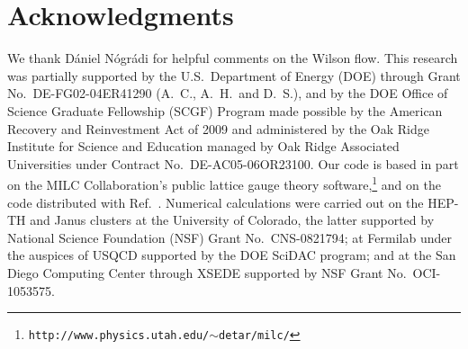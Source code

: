 \documentclass{PoS}
\newcommand{\refcite}[1]{Ref.~\cite{#1}}
\begin{document}
\section*{Acknowledgments} %
We thank D\'aniel N\'ogr\'adi for helpful comments on the Wilson flow.
This research was partially supported by the U.S.~Department of Energy (DOE) through Grant No.~DE-FG02-04ER41290 (A.~C., A.~H.\ and D.~S.), and by the DOE Office of Science Graduate Fellowship (SCGF) Program made possible by the American Recovery and Reinvestment Act of 2009 and administered by the Oak Ridge Institute for Science and Education managed by Oak Ridge Associated Universities under Contract No.~DE-AC05-06OR23100.
Our code is based in part on the MILC Collaboration's public lattice gauge theory software,\footnote{\texttt{http://www.physics.utah.edu/$\sim$detar/milc/}} and on the code distributed with \refcite{Borsanyi:2012zs}.
Numerical calculations were carried out on the HEP-TH and Janus clusters at the University of Colorado, the latter supported by National Science Foundation (NSF) Grant No.~CNS-0821794; at Fermilab under the auspices of USQCD supported by the DOE SciDAC program; and at the San Diego Computing Center through XSEDE supported by NSF Grant No.~OCI-1053575.





\end{document}
